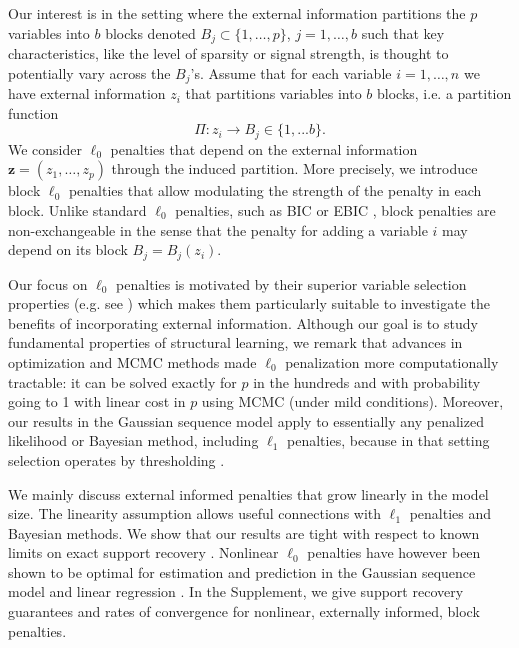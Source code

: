 \documentclass[bj,authoryear]{imsart}
\theoremstyle{plain}
\newcommand{\paul}[1]{{\small{\color{green} \sf $\spadesuit$ Paul: #1}}}
\newcommand{\bs}{\boldsymbol}
\begin{document}
Our interest is in the setting where the external information partitions the $p$ variables into $b$ blocks denoted $B_j \subset \{1,\ldots,p\}$, $j=1,\ldots,b$ such that key characteristics, like the level of sparsity or signal strength, is thought to potentially vary across the $B_j$'s. Assume that for each variable $i=1,\ldots,n$ we have external information $z_i$ that partitions variables into $b$ blocks,
i.e. a partition function 
$$\Pi: z_i \to B_j \in \{1,...b\}.$$ 
We consider $\ell_0$ penalties that depend on the external information $\bs z=(z_1,\ldots,z_p)$ through the induced partition. More precisely, we introduce block $\ell_0$ penalties that allow modulating the strength of the penalty in each block. Unlike standard $\ell_0$ penalties, such as BIC \citep{BIC} or EBIC \citep{EBIC}, block penalties are non-exchangeable in the sense that the penalty for adding a variable $i$ may depend on its block $B_j=B_j(z_i)$. 

Our focus on $\ell_0$ penalties is motivated by their superior variable selection properties (e.g. see \cite{infotheowainwright}) %
which makes them particularly suitable to investigate the benefits of incorporating external information. 
Although our goal is to study fundamental properties of structural learning,
we remark that advances in optimization and MCMC methods made $\ell_0$ penalization more computationally tractable: it can be solved exactly for $p$ in the hundreds \citep{bertsimas} and with probability going to 1 with linear cost in $p$ using MCMC \citep{Yang2016,zhou2022} (under mild conditions). Moreover, our results in the Gaussian sequence model apply to essentially any penalized likelihood or Bayesian method, including $\ell_1$ penalties, because in that setting selection operates by thresholding \citep{davidomiros}. 

We mainly discuss external informed penalties that grow linearly in the model size. The linearity assumption allows useful connections with $\ell_1$ penalties and Bayesian methods. We show that our results are tight with respect to known limits on exact support recovery \citep{butucea2018,infotheowainwright}. Nonlinear $\ell_0$ penalties have however been shown to be optimal for estimation and prediction in the Gaussian sequence model \citep{Wu2013} %
and linear regression \citep{Bunea2007}. In the Supplement, we give support recovery guarantees and rates of convergence for nonlinear, externally informed, block penalties.  
\smallskip
\end{document}

